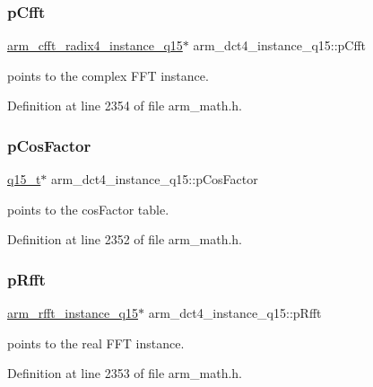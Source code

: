 \subsubsection{\texorpdfstring{p\+Cfft}{pCfft}}
{\footnotesize\ttfamily \hyperlink{structarm__cfft__radix4__instance__q15}{arm\+\_\+cfft\+\_\+radix4\+\_\+instance\+\_\+q15}$\ast$ arm\+\_\+dct4\+\_\+instance\+\_\+q15\+::p\+Cfft}

points to the complex F\+FT instance. 

Definition at line 2354 of file arm\+\_\+math.\+h.

\mbox{\label{structarm__dct4__instance__q15_ac76df681b1bd502fb4874c06f055dded}} 
\subsubsection{\texorpdfstring{p\+Cos\+Factor}{pCosFactor}}
{\footnotesize\ttfamily \hyperlink{arm__math_8h_ab5a8fb21a5b3b983d5f54f31614052ea}{q15\+\_\+t}$\ast$ arm\+\_\+dct4\+\_\+instance\+\_\+q15\+::p\+Cos\+Factor}

points to the cos\+Factor table. 

Definition at line 2352 of file arm\+\_\+math.\+h.

\mbox{\label{structarm__dct4__instance__q15_a11cf95c1cd9dd2dd5e4b81b8f88dc208}} 
\subsubsection{\texorpdfstring{p\+Rfft}{pRfft}}
{\footnotesize\ttfamily \hyperlink{structarm__rfft__instance__q15}{arm\+\_\+rfft\+\_\+instance\+\_\+q15}$\ast$ arm\+\_\+dct4\+\_\+instance\+\_\+q15\+::p\+Rfft}

points to the real F\+FT instance. 

Definition at line 2353 of file arm\+\_\+math.\+h.

\mbox{\label{structarm__dct4__instance__q15_abc6c847e9f906781e1d5da40e9aafa76}} 
